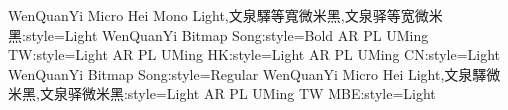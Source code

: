 \documentclass[11pt,a4paper]{article}
\begin{document}
WenQuanYi Micro Hei Mono Light,文泉驛等寬微米黑,文泉驿等宽微米黑:style=Light
WenQuanYi Bitmap Song:style=Bold
AR PL UMing TW:style=Light
AR PL UMing HK:style=Light
AR PL UMing CN:style=Light
WenQuanYi Bitmap Song:style=Regular
WenQuanYi Micro Hei Light,文泉驛微米黑,文泉驿微米黑:style=Light
AR PL UMing TW MBE:style=Light
\end{document}

